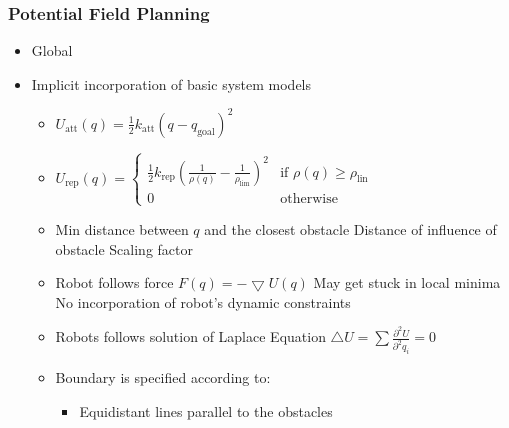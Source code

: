 \subsubsection{Potential Field Planning}
\begin{itemize}
     Robot follows gradient of potential field
    \item Global
    \item Implicit incorporation of basic system models
        \begin{itemize}
             $U(q) = \underbrace{U_{\text{att}}(q)}_{\text{attractive}} + \underbrace{U_{\text{rep}}(q)}_{\text{repulsive}}$
            \item $U_{\text{att}}(q) = \frac{1}{2} k_{\text{att}} (q - q_{\text{goal}})^2$
            \item $U_{\text{rep}}(q) =
\begin{cases}
    \frac{1}{2} k_{\text{rep}}(\frac{1}{\rho(q)} - \frac{1}{\rho_{\text{lim}}})^2 & \text{if } \rho(q) \ge \rho_{\text{lin}}\\
    0 & \text{otherwise}
\end{cases}$
            \item
                \begin{itemize*}
                     Min distance between $q$ and the closest obstacle
                     Distance of influence of obstacle
                     Scaling factor
                \end{itemize*}
            \item Robot follows force $F(q) = -\bigtriangledown U(q)$
            \icon May get stuck in local minima
            \icon No incorporation of robot's dynamic constraints
        \end{itemize}
        \begin{itemize}
            \item Robots follows solution of Laplace Equation $\triangle U = \sum \frac{\partial^2 U}{\partial^2 q_i} = 0$
            \item Boundary is specified according to:
                \begin{itemize}
                        \begin{itemize}
                            \item Equidistant lines parallel to the obstacles

\end{itemize}
\end{itemize}
\end{itemize}
\end{itemize}
